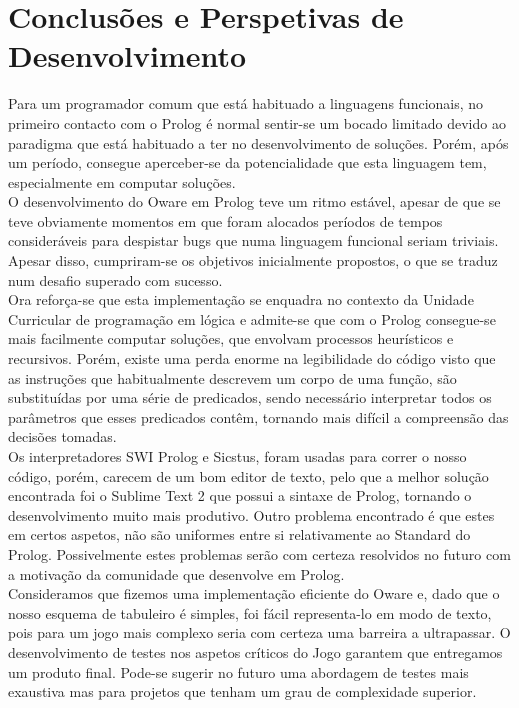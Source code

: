 \documentclass[15pt,a4paper]{article}
\begin{document}
\section{Conclusões e Perspetivas de Desenvolvimento}
Para um programador comum que está habituado a linguagens funcionais, no primeiro contacto com o Prolog é normal sentir-se um bocado limitado devido ao paradigma que está habituado a ter no desenvolvimento de soluções. Porém, após um período, consegue aperceber-se da potencialidade que esta linguagem tem, especialmente em computar soluções. \\
\indent O desenvolvimento do Oware em Prolog teve um ritmo estável, apesar de que se teve obviamente momentos em que foram alocados períodos de tempos consideráveis para despistar bugs que numa linguagem funcional seriam triviais. Apesar disso, cumpriram-se os objetivos inicialmente propostos, o que se traduz num desafio superado com sucesso.
\\ \indent Ora reforça-se que esta implementação se enquadra no contexto da Unidade Curricular de programação em lógica e admite-se que com o Prolog consegue-se mais facilmente computar soluções, que envolvam processos heurísticos e recursivos. Porém, existe uma perda enorme na legibilidade do código visto que as instruções que habitualmente descrevem um corpo de uma função, são substituídas por uma série de predicados, sendo necessário interpretar todos os parâmetros que esses predicados contêm, tornando mais difícil a compreensão das decisões tomadas. 
\\ \indent Os interpretadores SWI Prolog e Sicstus, foram usadas para correr o nosso código, porém, carecem de um bom editor de texto, pelo que a melhor solução encontrada foi o Sublime Text 2 que possui a sintaxe de Prolog, tornando o desenvolvimento muito mais produtivo. Outro problema encontrado é que estes em certos aspetos, não são uniformes entre si relativamente ao Standard do Prolog. Possivelmente estes problemas serão com certeza resolvidos no futuro com a motivação da comunidade que desenvolve em Prolog.
\\ 
\indent Consideramos que fizemos uma implementação eficiente do Oware e, dado que o nosso esquema de tabuleiro é simples, foi fácil representa-lo em modo de texto, pois para um jogo mais complexo seria com certeza uma barreira a ultrapassar. O desenvolvimento de testes nos aspetos críticos do Jogo garantem que entregamos um produto final. Pode-se sugerir no futuro uma abordagem de testes mais exaustiva mas para projetos que tenham um grau de complexidade superior. 
\end{document}
